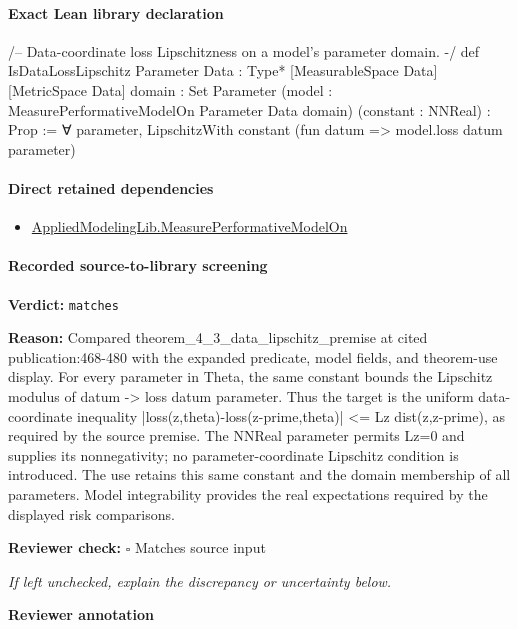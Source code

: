 \documentclass[10pt]{article}
\newcommand{\reviewerbox}{%
  \par\noindent\fbox{\parbox{0.96\linewidth}{\rule{0pt}{0.38in}}}\par
}
\newcommand{\reviewmatch}[1]{%
  \par\noindent\textbf{Reviewer check:} $\square$\; #1\par
  \noindent\emph{If left unchecked, explain the discrepancy or uncertainty below.}\par
}
\begin{document}
\paragraph{Exact Lean library declaration}
\begin{ReviewVerbatim}
/-- Data-coordinate loss Lipschitzness on a model's parameter domain. -/
def IsDataLossLipschitz
    {Parameter Data : Type*} [MeasurableSpace Data] [MetricSpace Data]
    {domain : Set Parameter} (model : MeasurePerformativeModelOn Parameter Data domain)
    (constant : NNReal) : Prop :=
  ∀ parameter, LipschitzWith constant (fun datum => model.loss datum parameter)
\end{ReviewVerbatim}

\paragraph{Direct retained dependencies}
\begin{itemize}\raggedright
\item \hyperlink{library-prerequisite-e14cc5e8b1e1460e}{Applied\allowbreak{}Modeling\allowbreak{}Lib.\allowbreak{}Measure\allowbreak{}Performative\allowbreak{}Model\allowbreak{}On}
\end{itemize}
\paragraph{Recorded source-to-library screening}
\textbf{Verdict:} \texttt{matches}
\\
{\raggedright
\textbf{Reason:} Compared theorem\_\allowbreak{}4\_\allowbreak{}3\_\allowbreak{}data\_\allowbreak{}lipschitz\_\allowbreak{}premise at cited publication:\allowbreak{}468-\allowbreak{}480 with the expanded predicate, model fields, and theorem-\allowbreak{}use display.\allowbreak{} For every parameter in Theta, the same constant bounds the Lipschitz modulus of datum -\allowbreak{}> loss datum parameter.\allowbreak{} Thus the target is the uniform data-\allowbreak{}coordinate inequality |loss(z,theta)-\allowbreak{}loss(z-\allowbreak{}prime,theta)| <= Lz dist(z,z-\allowbreak{}prime), as required by the source premise.\allowbreak{} The NNReal parameter permits Lz=0 and supplies its nonnegativity;\allowbreak{} no parameter-\allowbreak{}coordinate Lipschitz condition is introduced.\allowbreak{} The use retains this same constant and the domain membership of all parameters.\allowbreak{} Model integrability provides the real expectations required by the displayed risk comparisons.\allowbreak{}
\par}
\reviewmatch{Matches source input}
\noindent\textbf{Reviewer annotation}\par
\reviewerbox
\clearpage
\hypertarget{library-prerequisite-25221c4f931beacb}{}
\end{document}
